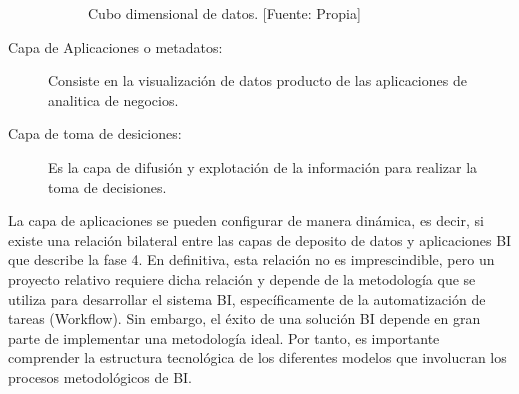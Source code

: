 \documentclass[11pt,titlepage]{report}
\begin{document}
\begin{description}
\begin{figure}[h]
	\centering
	\caption{Cubo dimensional de datos. [Fuente: Propia]} \label{fig: cubo}	
\end{figure}

\item[Capa de Aplicaciones o metadatos:] Consiste en la visualización de datos producto de las aplicaciones de analitica de negocios. 

\item[Capa de toma de desiciones:] Es la capa de difusión y explotación de la información para realizar la toma de decisiones.
\end{description}

La capa de aplicaciones se pueden configurar de manera dinámica, es decir, si existe una relación bilateral entre las capas de deposito de datos y aplicaciones BI que describe la fase 4. En definitiva, esta relación no es imprescindible, pero un proyecto relativo requiere dicha relación y depende de la metodología que se utiliza para desarrollar el sistema BI, específicamente de la automatización de tareas (Workflow). Sin embargo, el éxito de una solución BI depende en gran parte de implementar una metodología ideal. Por tanto, es importante comprender la estructura tecnológica de los diferentes modelos que involucran los procesos metodológicos de BI.
\end{document}
